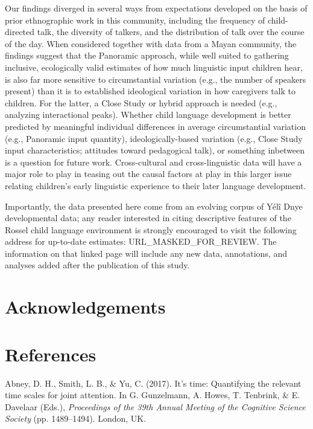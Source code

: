 \documentclass[,man,mask,floatsintext]{apa6}
\begin{document}
Our findings diverged in several ways from expectations developed on the
basis of prior ethnographic work in this community, including the
frequency of child-directed talk, the diversity of talkers, and the
distribution of talk over the course of the day. When considered
together with data from a Mayan community, the findings suggest that the
Panoramic approach, while well suited to gathering inclusive,
ecologically valid estimates of how much linguistic input children hear,
is also far more sensitive to circumstantial variation (e.g., the number
of speakers present) than it is to established ideological variation in
how caregivers talk to children. For the latter, a Close Study or hybrid
approach is needed (e.g., analyzing interactional peaks). Whether child
language development is better predicted by meaningful individual
differences in average circumstantial variation (e.g., Panoramic input
quantity), ideologically-based variation (e.g., Close Study input
characteristics; attitudes toward pedagogical talk), or something
inbetween is a question for future work. Cross-cultural and
cross-linguistic data will have a major role to play in teasing out the
causal factors at play in this larger issue relating children's early
linguistic experience to their later language development.

Importantly, the data presented here come from an evolving corpus of
Yélî Dnye developmental data; any reader interested in citing
descriptive features of the Rossel child language environment is
strongly encouraged to visit the following address for up-to-date
estimates: URL\_MASKED\_FOR\_REVIEW. The information on that linked page
will include any new data, annotations, and analyses added after the
publication of this study.

\section{Acknowledgements}\label{acknowledgements}

\newpage

\section{References}\label{refs}

\begingroup
\setlength{\parindent}{-0.5in} \setlength{\leftskip}{0.5in}

\hypertarget{refs}{}
\hypertarget{ref-abney2017time}{}
Abney, D. H., Smith, L. B., \& Yu, C. (2017). It's time: Quantifying the
relevant time scales for joint attention. In G. Gunzelmann, A. Howes, T.
Tenbrink, \& E. Davelaar (Eds.), \emph{Proceedings of the 39th Annual
Meeting of the Cognitive Science Society} (pp. 1489--1494). London, UK.
\end{document}

